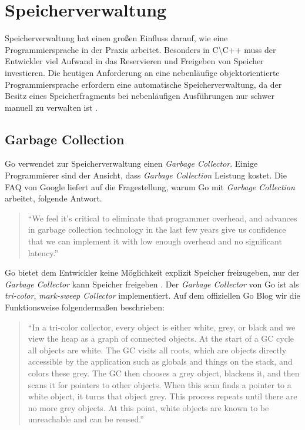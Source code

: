 \chapter{Speicherverwaltung}
Speicherverwaltung hat einen großen Einfluss darauf, wie eine Programmiersprache in der Praxis arbeitet. 
Besonders in C{\textbackslash}C++ muss der Entwickler viel Aufwand in das Reservieren und Freigeben von Speicher investieren.
Die heutigen Anforderung an eine nebenläufige objektorientierte Programmiersprache erfordern eine automatische Speicherverwaltung, da der Besitz eines Speicherfragments bei nebenläufigen Ausführungen nur schwer manuell zu verwalten ist \cite{RobPike.2012}.

\section{Garbage Collection}
Go verwendet zur Speicherverwaltung einen \textit{Garbage Collector}. 
Einige Programmierer sind der Ansicht, dass \textit{Garbage Collection} Leistung kostet.
Die FAQ von Google liefert auf die Fragestellung, warum Go mit \textit{Garbage Collection} arbeitet, folgende Antwort.

\begin{quote}
\enquote{We feel it's critical to eliminate that programmer overhead, and advances in garbage collection technology in the last few years give us confidence that we can implement it with low enough overhead and no significant latency.}\cite{Golang.FAQ}
\end{quote}

Go bietet dem Entwickler keine Möglichkeit explizit Speicher freizugeben, nur der \textit{Garbage Collector} kann Speicher freigeben \cite{RobPike.2012}.
Der \textit{Garbage Collector} von Go ist als \textit{tri-color}, \textit{mark-sweep Collector} implementiert.
Auf dem offiziellen Go Blog wir die Funktionsweise folgendermaßen beschrieben:

\begin{quote}
\enquote{In a tri-color collector, every object is either white, grey, or black and we view the heap as a graph of connected objects. At the start of a GC cycle all objects are white. The GC visits all roots, which are objects directly accessible by the application such as globals and things on the stack, and colors these grey. The GC then chooses a grey object, blackens it, and then scans it for pointers to other objects. When this scan finds a pointer to a white object, it turns that object grey. This process repeats until there are no more grey objects. At this point, white objects are known to be unreachable and can be reused.} \cite{Go.GC}
\end{quote}

